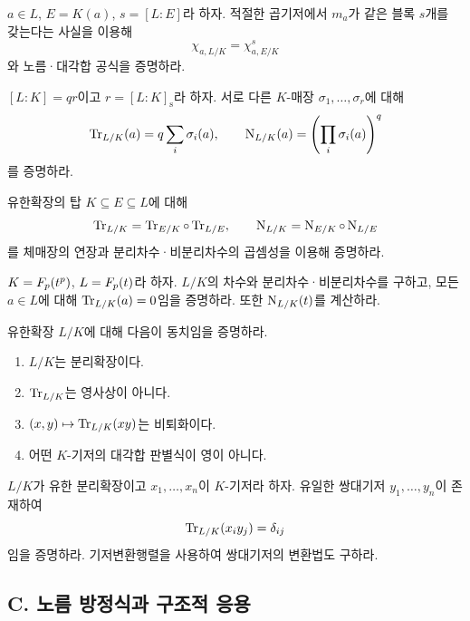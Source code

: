 \begin{exercise}
$a\in L$, $E=K(a)$, $s=[L:E]$라 하자. 적절한 곱기저에서
$m_a$가 같은 블록 $s$개를 갖는다는 사실을 이용해
\[
  \chi_{a,L/K}=\chi_{a,E/K}^s
\]
와 노름·대각합 공식을 증명하라.
\end{exercise}

\begin{exercise}[*]
$[L:K]=qr$이고 $r=[L:K]_{\mathrm s}$라 하자.
서로 다른 $K$-매장 $\sigma_1,\dots,\sigma_r$에 대해
\[
  \operatorname{Tr}_{L/K}(a)=q\sum_i\sigma_i(a),\qquad
  \operatorname{N}_{L/K}(a)=\left(\prod_i\sigma_i(a)\right)^q
\]
를 증명하라.
\end{exercise}

\begin{exercise}[*]
유한확장의 탑 $K\subseteq E\subseteq L$에 대해
\[
  \operatorname{Tr}_{L/K}=\operatorname{Tr}_{E/K}\circ\operatorname{Tr}_{L/E},
  \qquad
  \operatorname{N}_{L/K}=\operatorname{N}_{E/K}\circ\operatorname{N}_{L/E}
\]
를 체매장의 연장과 분리차수·비분리차수의 곱셈성을 이용해 증명하라.
\end{exercise}

\begin{exercise}
$K=F_p(t^p)$, $L=F_p(t)$라 하자.
$L/K$의 차수와 분리차수·비분리차수를 구하고,
모든 $a\in L$에 대해 $\operatorname{Tr}_{L/K}(a)=0$임을 증명하라.
또한 $\operatorname{N}_{L/K}(t)$를 계산하라.
\end{exercise}

\begin{exercise}[*]
유한확장 $L/K$에 대해 다음이 동치임을 증명하라.
\begin{enumerate}[label=(\alph*)]
  \item $L/K$는 분리확장이다.
  \item $\operatorname{Tr}_{L/K}$는 영사상이 아니다.
  \item $(x,y)\mapsto\operatorname{Tr}_{L/K}(xy)$는 비퇴화이다.
  \item 어떤 $K$-기저의 대각합 판별식이 영이 아니다.
\end{enumerate}
\end{exercise}

\begin{exercise}
$L/K$가 유한 분리확장이고 $x_1,\dots,x_n$이 $K$-기저라 하자.
유일한 쌍대기저 $y_1,\dots,y_n$이 존재하여
\[
  \operatorname{Tr}_{L/K}(x_i y_j)=\delta_{ij}
\]
임을 증명하라. 기저변환행렬을 사용하여 쌍대기저의 변환법도 구하라.
\end{exercise}

\subsection*{C. 노름 방정식과 구조적 응용}

